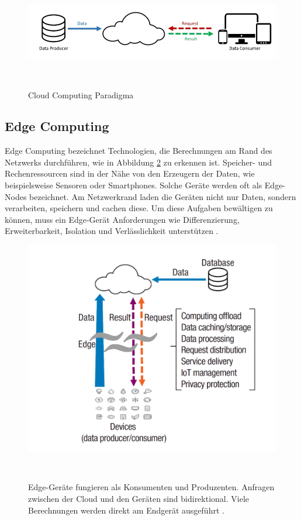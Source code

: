 \documentclass{sigchi}
\begin{document}
\begin{figure}
\centering
  \includegraphics[width=0.65\columnwidth]{figures/cloud-computing-structure.PNG}
  \caption{Cloud Computing Paradigma \cite{vision-challenges:2016}}~\label{fig:cloud-computing}
\end{figure}

\subsection{Edge Computing}
Edge Computing bezeichnet Technologien, die Berechnungen am Rand des Netzwerks durchführen, wie in Abbildung \ref{fig:edge-computing} zu erkennen ist. Speicher- und Rechenressourcen sind in der Nähe von den Erzeugern der Daten, wie beispielsweise Sensoren oder Smartphones. Solche Geräte werden oft als  Edge-Nodes bezeichnet. Am Netzwerkrand laden die Geräten nicht nur Daten, sondern verarbeiten, speichern und cachen diese. Um diese Aufgaben bewältigen zu können, muss ein Edge-Gerät Anforderungen wie Differenzierung, Erweiterbarkeit, Isolation und Verlässlichkeit unterstützen \cite{promise-edge-computing:2016}.

\begin{figure}
\centering
  \includegraphics[width=0.65\columnwidth]{figures/edge-computing-structure.PNG}
  \caption{Edge-Geräte fungieren als Konsumenten und Produzenten. Anfragen zwischen der Cloud und den Geräten sind bidirektional. Viele Berechnungen werden direkt am Endgerät ausgeführt \cite{promise-edge-computing:2016}.}~\label{fig:edge-computing}
\end{figure}
\end{document}
